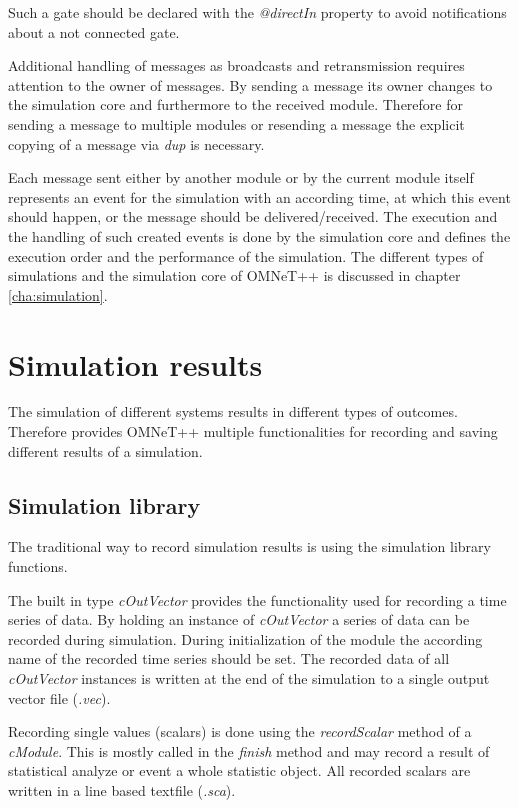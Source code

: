 Such a gate should be declared with the \emph{@directIn} property to avoid notifications about a not connected gate. \cite[section 4.7.5]{omnet_manual}

Additional handling of messages as broadcasts and retransmission requires attention to the owner of messages.
By sending a message its owner changes to the simulation core and furthermore to the received module.
Therefore for sending a message to multiple modules or resending a message the explicit copying of a message via \emph{dup} is necessary. \cite[section 4.7.3]{omnet_manual}

Each message sent either by another module or by the current module itself represents an event for the simulation with an according time, at which this event should happen, or the message should be delivered/received.
The execution and the handling of such created events is done by the simulation core and defines the execution order and the performance of the simulation.
The different types of simulations and the simulation core of OMNeT++ is discussed in chapter \ref{cha:simulation}.


\section{Simulation results}
\label{sec:omnet_results}
The simulation of different systems results in different types of outcomes.
Therefore provides OMNeT++ multiple functionalities for recording and saving different results of a simulation.


\subsection{Simulation library}
\label{sec:omnet_results_sim_lib}
The traditional way to record simulation results is using the simulation library functions.

The built in type \emph{cOutVector} provides the functionality used for recording a time series of data.
By holding an instance of \emph{cOutVector} a series of data can be recorded during simulation.
During initialization of the module the according name of the recorded time series should be set.
The recorded data of all \emph{cOutVector} instances is written at the end of the simulation to a single output vector file (\emph{.vec}). \cite[section 7.9.1]{omnet_manual}

Recording single values (scalars) is done using the \emph{recordScalar} method of a \emph{cModule}.
This is mostly called in the \emph{finish} method and may record a result of statistical analyze or event a whole statistic object.
All recorded scalars are written in a line based textfile (\emph{.sca}). \cite[section 7.9.2]{omnet_manual}

